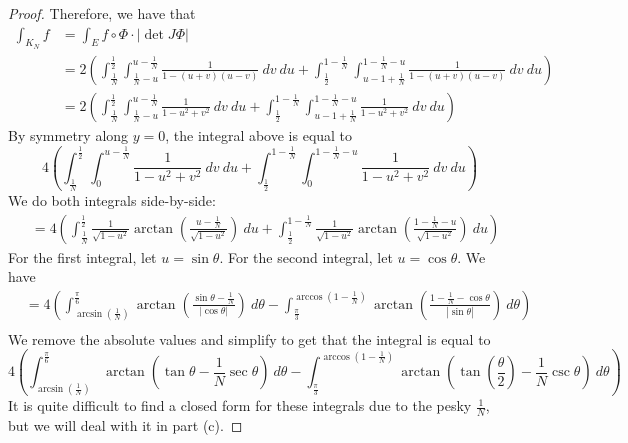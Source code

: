 \documentclass{article}
\theoremstyle{plain} %
\numberwithin{thm}{section} %
\theoremstyle{definition}
\begin{document}
\begin{proof}
    Therefore, we have that
    \begin{align*}
        \int _{K_N} f &= \int _E f \circ \Phi \cdot \left\vert \det J \Phi \right\vert \\
        &= 2\left( \int _{\frac{1}{N}}^{\frac{1}{2}} \int _{\frac{1}{N} - u}^{u - \frac{1}{N}} \frac{1}{1 - (u + v)(u-v)}\ dv\ du + \int _{\frac{1}{2}}^{1-\frac{1}{N}} \int _{u-1+\frac{1}{N}}^{1-\frac{1}{N}-u} \frac{1}{1 - (u + v)(u-v)}\ dv\ du\right) \\
        &= 2\left( \int _{\frac{1}{N}}^{\frac{1}{2}} \int _{\frac{1}{N} - u}^{u - \frac{1}{N}} \frac{1}{1 - u^2 + v^2}\ dv\ du + \int _{\frac{1}{2}}^{1-\frac{1}{N}} \int _{u-1+\frac{1}{N}}^{1-\frac{1}{N}-u} \frac{1}{1 - u^2 + v^2}\ dv\ du\right)
    \end{align*}
    By symmetry along \(y = 0\), the integral above is equal to
    \[
        4\left( \int _{\frac{1}{N}}^{\frac{1}{2}} \int _{0}^{u - \frac{1}{N}} \frac{1}{1 - u^2 + v^2}\ dv\ du + \int _{\frac{1}{2}}^{1-\frac{1}{N}} \int _{0}^{1-\frac{1}{N}-u} \frac{1}{1 - u^2 + v^2}\ dv\ du\right)
    \]
    We do both integrals side-by-side:
    \begin{align*}
        &=4\left( \int _{\frac{1}{N}}^{\frac{1}{2}} \frac{1}{\sqrt{1 - u^2}}\arctan \left( \frac{u-\frac{1}{N}}{\sqrt{1-u^2}} \right) \ du + \int _{\frac{1}{2}}^{1-\frac{1}{N}}\frac{1}{\sqrt{1 - u^2}}\arctan \left( \frac{1-\frac{1}{N} - u}{\sqrt{1-u^2}} \right)\ du\right)
    \end{align*}
    For the first integral, let \(u = \sin \theta\). For the second integral, let \(u = \cos \theta\). We have
    \begin{align*}
        &=4\left( \int _{\arcsin \left( \frac{1}{N} \right)}^{\frac{\pi}{6}} \arctan \left( \frac{\sin \theta -\frac{1}{N}}{|\cos \theta |} \right) \ d \theta - \int _{\frac{\pi}{3}}^{\arccos \left( 1-\frac{1}{N} \right)} \arctan \left( \frac{1-\frac{1}{N} - \cos \theta}{|\sin \theta |} \right)\ d \theta\right) \\
    \end{align*}
    We remove the absolute values and simplify to get that the integral is equal to
    \[
        4\left( \int _{\arcsin \left( \frac{1}{N} \right)}^{\frac{\pi}{6}} \arctan \left( \tan \theta - \frac{1}{N}\sec \theta \right) \ d \theta - \int _{\frac{\pi}{3}}^{\arccos \left( 1-\frac{1}{N} \right)} \arctan \left( \tan \left( \frac{\theta}{2} \right) - \frac{1}{N}\csc \theta \right)\ d \theta\right)
    \]
    It is quite difficult to find a closed form for these integrals due to the pesky \(\frac{1}{N}\), but we will deal with it in part (c).


\end{proof}
\end{document}
